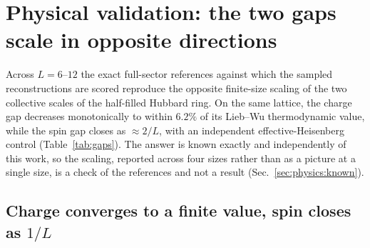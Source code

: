 %

\section{Physical validation: the two gaps scale in opposite directions}\label{sec:physics}

Across $L=6$--$12$ the exact full-sector references against which the sampled reconstructions are
scored reproduce the opposite finite-size scaling of the two collective scales of the half-filled
Hubbard ring. On the same lattice, the charge gap decreases monotonically to within $6.2\%$ of its
Lieb--Wu thermodynamic value, while the spin gap closes as $\approx2/L$, with an independent
effective-Heisenberg control (Table~\ref{tab:gaps}). The answer is known exactly and independently
of this work, so the scaling, reported across four sizes rather than as a picture at a single size,
is a check of the references and not a result (Sec.~\ref{sec:physics:known}).

\subsection{Charge converges to a finite value, spin closes as \texorpdfstring{$1/L$}{1/L}}\label{sec:gaps}

